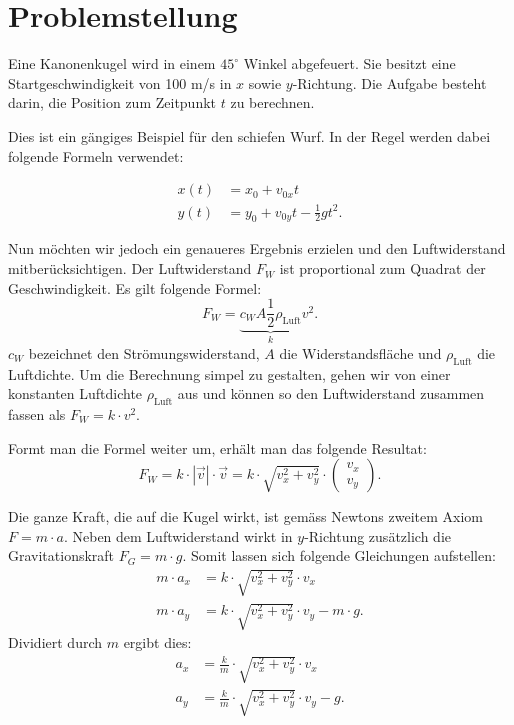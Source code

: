 \section{Problemstellung
\label{perturbation:section:problemstellung}}
Eine Kanonenkugel wird in einem $45^{\circ}$ Winkel abgefeuert.
Sie besitzt eine Startgeschwindigkeit von 100 m/s in $x$ sowie $y$-Richtung.
%
Die Aufgabe besteht darin, die Position zum Zeitpunkt $t$ zu berechnen.

Dies ist ein gängiges Beispiel für den schiefen Wurf.
In der Regel werden dabei folgende Formeln verwendet:

\begin{equation}\label{eq:x_simple}
\begin{aligned}
    x(t) &= x_0 + v_{0x}t\\
    y(t) &= y_0 + v_{0y}t - \frac{1}{2}gt^2.
\end{aligned}
\end{equation}


Nun möchten wir jedoch ein genaueres Ergebnis erzielen und den Luftwiderstand mitberücksichtigen.
Der Luftwiderstand $F_W$ ist proportional zum Quadrat der Geschwindigkeit.
%
Es gilt folgende Formel:
\[
F_W = \underbrace{c_WA\frac{1}{2}\rho_{\text{Luft}}}_{k}v^2.
\]
$c_W$ bezeichnet den Strömungswiderstand, $A$ die Widerstandsfläche und $\rho_{\text{Luft}}$ die Luftdichte.
%
%
%
%
Um die Berechnung simpel zu gestalten, gehen wir von einer konstanten Luftdichte $\rho_{\text{Luft}}$ aus und können so den Luftwiderstand zusammen fassen als $F_W = k \cdot v^2$.

Formt man die Formel weiter um, erhält man das folgende Resultat:
\[
F_W = k \cdot |\vec{v}| \cdot \vec{v} = k \cdot \sqrt{v_x^2 + v_y^2} \cdot \begin{pmatrix}v_x\\v_y\end{pmatrix}.
\]

Die ganze Kraft, die auf die Kugel wirkt, ist gemäss Newtons zweitem Axiom $F = m \cdot a$.
Neben dem Luftwiderstand wirkt in $y$-Richtung zusätzlich die Gravitationskraft $F_G = m \cdot g$.
%
Somit lassen sich folgende Gleichungen aufstellen:
\begin{align*}
m \cdot a_x &= k \cdot \sqrt{v_x^2 + v_y^2} \cdot v_x\\
m \cdot a_y &= k \cdot \sqrt{v_x^2 + v_y^2} \cdot v_y - m \cdot g.
\end{align*}
Dividiert durch $m$ ergibt dies:
\begin{align*}
a_x &= \frac{k}{m} \cdot \sqrt{v_x^2 + v_y^2} \cdot v_x\\
a_y &= \frac{k}{m} \cdot \sqrt{v_x^2 + v_y^2} \cdot v_y - g.
\end{align*}

